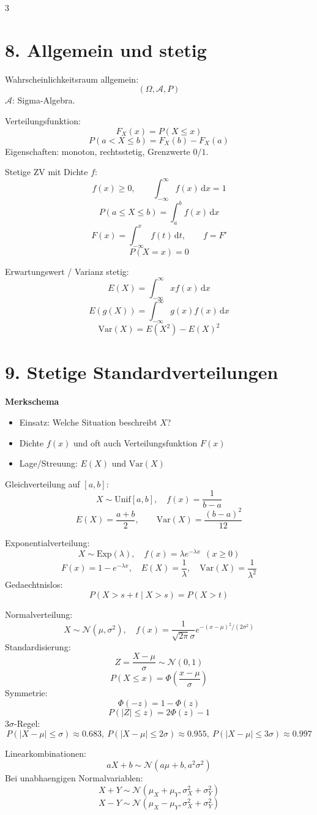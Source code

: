 \documentclass[a4paper,8pt,landscape]{article}
\newcommand{\dd}{\,\mathrm{d}}
\newcommand{\Var}{\mathrm{Var}}
\newcommand{\Exp}{\mathrm{Exp}}
\newcommand{\Unif}{\mathrm{Unif}}
\newcommand{\Normal}{\mathcal{N}}
\begin{document}
\begin{multicols*}{3}
\section*{8. Allgemein und stetig}
Wahrscheinlichkeitsraum allgemein:
\[
(\Omega,\mathcal{A},P)
\]
$\mathcal{A}$: Sigma-Algebra.

Verteilungsfunktion:
\[
F_X(x)=P(X\le x)
\]
\[
P(a<X\le b)=F_X(b)-F_X(a)
\]
Eigenschaften: monoton, rechtsstetig, Grenzwerte $0/1$.

Stetige ZV mit Dichte $f$:
\[
f(x)\ge 0,\qquad \int_{-\infty}^{\infty}f(x)\dd x=1
\]
\[
P(a\le X\le b)=\int_a^b f(x)\dd x
\]
\[
F(x)=\int_{-\infty}^x f(t)\dd t,\qquad f=F'
\]
\[
P(X=x)=0
\]

Erwartungswert / Varianz stetig:
\[
E(X)=\int_{-\infty}^{\infty}x f(x)\dd x
\]
\[
E(g(X))=\int_{-\infty}^{\infty}g(x)f(x)\dd x
\]
\[
\Var(X)=E(X^2)-E(X)^2
\]

\section*{9. Stetige Standardverteilungen}
\textbf{Merkschema}
\begin{itemize}
  \item Einsatz: Welche Situation beschreibt $X$?
  \item Dichte $f(x)$ und oft auch Verteilungsfunktion $F(x)$
  \item Lage/Streuung: $E(X)$ und $\Var(X)$
\end{itemize}

Gleichverteilung auf $[a,b]$:
\[
X\sim \Unif[a,b],\quad f(x)=\frac{1}{b-a}
\]
\[
E(X)=\frac{a+b}{2},\qquad \Var(X)=\frac{(b-a)^2}{12}
\]

Exponentialverteilung:
\[
X\sim \Exp(\lambda),\quad f(x)=\lambda e^{-\lambda x}\ \ (x\ge 0)
\]
\[
F(x)=1-e^{-\lambda x},\quad E(X)=\frac{1}{\lambda},\quad \Var(X)=\frac{1}{\lambda^2}
\]
Gedaechtnislos:
\[
P(X>s+t\mid X>s)=P(X>t)
\]

Normalverteilung:
\[
X\sim \Normal(\mu,\sigma^2),\quad f(x)=\frac{1}{\sqrt{2\pi}\sigma}e^{-(x-\mu)^2/(2\sigma^2)}
\]
Standardisierung:
\[
Z=\frac{X-\mu}{\sigma}\sim \Normal(0,1)
\]
\[
P(X\le x)=\Phi\left(\frac{x-\mu}{\sigma}\right)
\]
Symmetrie:
\[
\Phi(-z)=1-\Phi(z)
\]
\[
P(|Z|\le z)=2\Phi(z)-1
\]
$3\sigma$-Regel:
\[
P(|X-\mu|\le \sigma)\approx 0.683,\ 
P(|X-\mu|\le 2\sigma)\approx 0.955,\ 
P(|X-\mu|\le 3\sigma)\approx 0.997
\]

Linearkombinationen:
\[
aX+b\sim \Normal(a\mu+b,a^2\sigma^2)
\]
Bei unabhaengigen Normalvariablen:
\[
X+Y\sim \Normal(\mu_X+\mu_Y,\sigma_X^2+\sigma_Y^2)
\]
\[
X-Y\sim \Normal(\mu_X-\mu_Y,\sigma_X^2+\sigma_Y^2)
\]


\end{multicols*}
\end{document}
